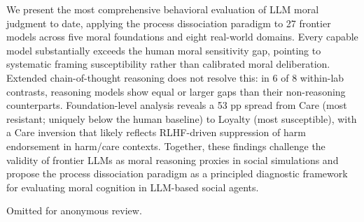\documentclass{article}
\begin{document}
We present the most comprehensive behavioral evaluation of LLM moral judgment to date, applying the process dissociation paradigm to 27 frontier models across five moral foundations and eight real-world domains. Every capable model substantially exceeds the human moral sensitivity gap, pointing to systematic framing susceptibility rather than calibrated moral deliberation. Extended chain-of-thought reasoning does not resolve this: in 6 of 8 within-lab contrasts, reasoning models show equal or larger gaps than their non-reasoning counterparts. Foundation-level analysis reveals a 53 pp spread from Care (most resistant; uniquely below the human baseline) to Loyalty (most susceptible), with a Care inversion that likely reflects RLHF-driven suppression of harm endorsement in harm/care contexts. Together, these findings challenge the validity of frontier LLMs as moral reasoning proxies in social simulations and propose the process dissociation paradigm as a principled diagnostic framework for evaluating moral cognition in LLM-based social agents.

\begin{ack}
Omitted for anonymous review.
\end{ack}



\end{document}
